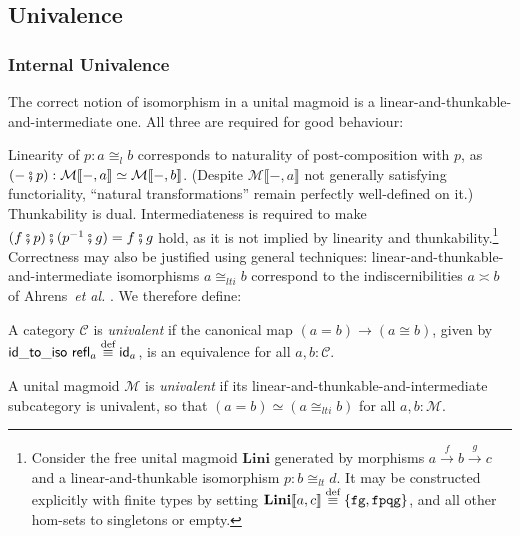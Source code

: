 \documentclass[runningheads]{llncs}
\makeatletter
\newcommand*{\etal}{~\textit{et al.\@}}
\newcommand*\rocqlogo{\usebox{\rocqlogobox}}
\newcommand{\lemmaref}[3]{\href{https://github.com/UniMath/UniMath/blob/94fae0eda57a778cec704bfa73b4ff525c9bc475/#1\#L#2?name=#3}{\rocqlogo}}
\newcommand{\acat}[1]{\mathcal{#1}}
\newcommand{\C}{\acat{C}}
\newcommand{\M}{\acat{M}}
\newcommand{\Cl}[1]{#1_l}
\newcommand{\Clt}[1]{#1_{lt}}
\newcommand{\Clti}[1]{#1_{lti}}
\newcommand{\wkcat}[1]{\mathbf{#1}}
\newcommand{\id}{\mathsf{id}}
\newcommand{\dcomp}{\fatsemi}
\newcommand{\morsof}[3]{{#1}\llbracket{#2},{#3}\rrbracket}
\newcommand{\defequiv}{\overset{\mathrm{\textup{def}}}{\equiv}}
\newcommand{\refl}{\mathsf{refl}}
\newcommand{\idtoiso}{\mathsf{id\_to\_iso}} %
\makeatother
\begin{document}
\subsection{Univalence}
\label{sec:univalence}
\subsubsection*{Internal Univalence}
\label{sec:internal-univalence}
The correct notion of isomorphism in a unital magmoid is a
linear\hyp{}and\hyp{}thunkable\hyp{}and\hyp{}intermediate one.  All three are required for
good behaviour:

\begin{remark}
\label{rem:um-yoneda-isos}
Linearity of \(p : a \Cl\cong b\) corresponds to naturality of
post\hyp{}composition with \(p\), as \((- \dcomp p) : \morsof\M{-}{a}
\simeq \morsof\M{-}{b}\). (Despite \(\morsof\M{-}{a}\) not generally
satisfying functoriality, ``natural transformations'' remain perfectly
well\hyp{}defined on it.) Thunkability is dual. Intermediateness is
required to make \((f \dcomp p) \dcomp (p^{-1} \dcomp g) = f \dcomp
g\) hold, as it is not implied by linearity and thunkability.\footnote{Consider the free unital magmoid \(\wkcat{Lini}\) generated by
morphisms \(a \xrightarrow{f} b \xrightarrow{g} c\) and a
linear\hyp{}and\hyp{}thunkable isomorphism \(p : b \Clt\cong d\). It may be
constructed explicitly with finite types by setting
\(\morsof{\wkcat{Lini}}{a}{c} \defequiv \{\texttt{fg},
\texttt{fpqg}\}\), and all other hom\hyp{}sets to singletons or empty.}
Correctness may also be justified using general techniques:
linear\hyp{}and\hyp{}thunkable\hyp{}and\hyp{}intermediate isomorphisms \(a \Clti\cong b\)
correspond to the indiscernibilities \(a \asymp b\) of
Ahrens\etal{} \cite{Ahrens22}. We therefore define:
\end{remark}

\begin{definition}[{\lemmaref{UniMath/CategoryTheory/Core/Univalence.v}{43}{is\_univalent} \cite{Ahrens15}}]
\label{def:cat-univalent}
A category \(\C\) is \emph{univalent} if the canonical map \((a = b) \to (a
\cong b)\), given by \(\idtoiso\ \refl_a \defequiv \id_a\), is an
equivalence for all \(a,b:\C\).
\end{definition}
\begin{definition}[{\lemmaref{UniMath/CategoryTheory/Nonassociative/UnitalMagmoids/Univalence.v}{121}{is\_um\_univalent}}]
\label{def:um-univalent}
A unital magmoid \(\M\) is \emph{univalent} if its
linear\hyp{}and\hyp{}thunkable\hyp{}and\hyp{}intermediate subcategory is univalent, so
that \((a = b) \simeq (a \Clti\cong b)\) for all \(a,b:\M\).
\end{definition}
\end{document}
